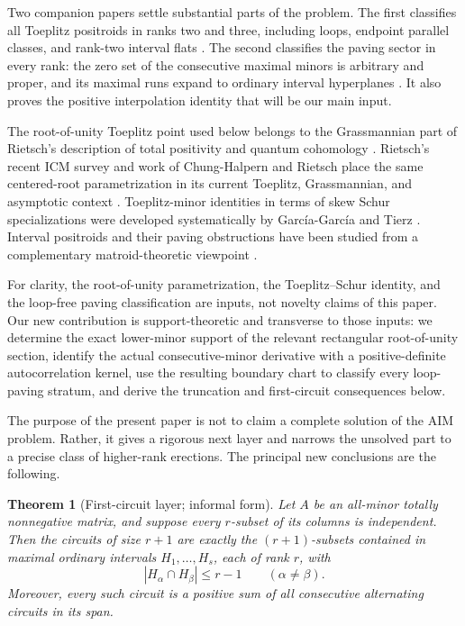 \documentclass[11pt]{amsart}
\newtheorem{theorem}{Theorem}[section]
\theoremstyle{definition}
\theoremstyle{remark}
\begin{document}
Two companion papers settle substantial parts of the problem.  The first classifies all Toeplitz positroids in ranks two and three, including loops, endpoint parallel classes, and rank-two interval flats \cite{CGQlow}.  The second classifies the paving sector in every rank: the zero set of the consecutive maximal minors is arbitrary and proper, and its maximal runs expand to ordinary interval hyperplanes \cite{CGQpaving}.  It also proves the positive interpolation identity that will be our main input.

The root-of-unity Toeplitz point used below belongs to the Grassmannian part of Rietsch's description of total positivity and quantum cohomology \cite{RietschGrassmannian,Rietsch}.  Rietsch's recent ICM survey and work of Chung-Halpern and Rietsch place the same centered-root parametrization in its current Toeplitz, Grassmannian, and asymptotic context \cite{RietschSurvey,ChungHalpernRietsch}.  Toeplitz-minor identities in terms of skew Schur specializations were developed systematically by Garc\'ia-Garc\'ia and Tierz \cite{GarciaTierz}.  Interval positroids and their paving obstructions have been studied from a complementary matroid-theoretic viewpoint \cite{Knutson,Park}.

For clarity, the root-of-unity parametrization, the Toeplitz--Schur identity, and the loop-free paving classification are inputs, not novelty claims of this paper.  Our new contribution is support-theoretic and transverse to those inputs: we determine the exact lower-minor support of the relevant rectangular root-of-unity section, identify the actual consecutive-minor derivative with a positive-definite autocorrelation kernel, use the resulting boundary chart to classify every loop-paving stratum, and derive the truncation and first-circuit consequences below.

The purpose of the present paper is not to claim a complete solution of the AIM problem.  Rather, it gives a rigorous next layer and narrows the unsolved part to a precise class of higher-rank erections.  The principal new conclusions are the following.

\begin{theorem}[First-circuit layer; informal form]\label{thm:intro-first-circuit}
Let $A$ be an all-minor totally nonnegative matrix, and suppose every $r$-subset of its columns is independent.  Then the circuits of size $r+1$ are exactly the $(r+1)$-subsets contained in maximal ordinary intervals $H_1,\ldots,H_s$, each of rank $r$, with
\[
 |H_\alpha\cap H_\beta|\le r-1\qquad(\alpha\ne\beta).
\]
Moreover, every such circuit is a positive sum of all consecutive alternating circuits in its span.
\end{theorem}
\end{document}
